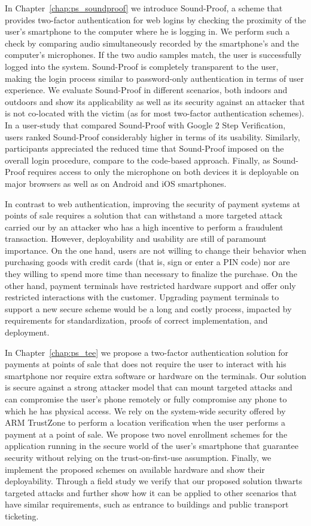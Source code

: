 In Chapter~\ref{chap:ps_soundproof} we introduce Sound-Proof, a scheme that provides two-factor authentication for web logins by checking the proximity of the user's smartphone to the computer where he is logging in. We perform such a check by comparing audio simultaneously recorded by the smartphone's and the computer's microphones. If the two audio samples match, the user is successfully logged into the system. Sound-Proof is completely transparent to the user, making the login process similar to password-only authentication in terms of user experience. We evaluate Sound-Proof in different scenarios, both indoors and outdoors and show its applicability as well as its security against an attacker that is not co-located with the victim (as for most two-factor authentication schemes). In a user-study that compared Sound-Proof with Google 2 Step Verification, users ranked Sound-Proof considerably higher in terms of its usability. Similarly, participants appreciated the reduced time that Sound-Proof imposed on the overall login procedure, compare to the code-based approach. Finally, as Sound-Proof requires access to only the microphone on both devices it is deployable on major browsers as well as on Android and iOS smartphones.

In contrast to web authentication, improving the security of payment systems at points of sale requires a solution that can withstand a more targeted attack carried our by an attacker who has a high incentive to perform a fraudulent transaction. However, deployability and usability are still of paramount importance. On the one hand, users are not willing to change their behavior when purchasing goods with credit cards (that is, sign or enter a PIN code) nor are they willing to spend more time than necessary to finalize the purchase. On the other hand, payment terminals have restricted hardware support and offer only restricted interactions with the customer. Upgrading payment terminals to support a new secure scheme would be a long and costly process, impacted by requirements for standardization, proofs of correct implementation, and deployment.

In Chapter~\ref{chap:ps_tee} we propose a two-factor authentication solution for payments at points of sale that does not require the user to interact with his smartphone nor require extra software or hardware on the terminals. Our solution is secure against a strong attacker model that can mount targeted attacks and can compromise the user's phone remotely or fully compromise any phone to which he has physical access. We rely on the system-wide security offered by ARM TrustZone to perform a location verification when the user performs a payment at a point of sale. We propose two novel enrollment schemes for the application running in the secure world of the user's smartphone that guarantee security without relying on the trust-on-first-use assumption. Finally, we implement the proposed schemes on available hardware and show their deployability. Through a field study we verify that our proposed solution thwarts targeted attacks and further show how it can be applied to other scenarios that have similar requirements, such as entrance to buildings and public transport ticketing.